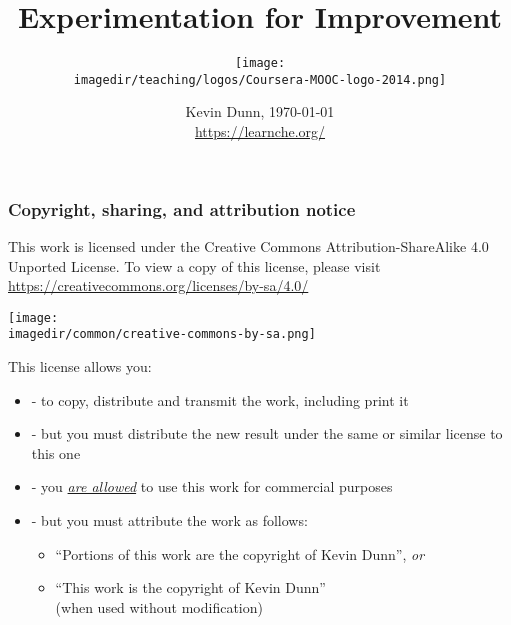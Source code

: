 \documentclass[handout,11pt,aspectratio=169,mathserif]{beamer}
\title[]{\LARGE Experimentation for Improvement}
\subtitle[]{\vspace{0.5cm} \texttt{[image: \\imagedir/teaching/logos/Coursera-MOOC-logo-2014.png]} \vspace{-1.5cm} }\author[]{}
\institute[]{}
\date[]{Kevin Dunn, \today \\ \vspace{0cm}
{{\footnotesize {\tt } \href{https://learnche.org/}{https://learnche.org/}\\} \vspace{0.5cm}}
{\LARGE \color{blue}{Design and Analysis of Experiments - An Overview}}
}
\begin{document}
\begin{frame} \titlepage \end{frame}
\begin{frame}\frametitle{Copyright, sharing, and attribution notice}

	{\footnotesize This work is licensed under the Creative Commons Attribution-ShareAlike 4.0 Unported License. To view a copy of this license,
	please visit \href{https://creativecommons.org/licenses/by-sa/4.0/}{https://creativecommons.org/licenses/by-sa/4.0/}}

	\vspace{0.0cm}
	\begin{flushright}
		\texttt{[image: \\imagedir/common/creative-commons-by-sa.png]}
	\end{flushright}
	\vspace{-0.4cm}
	\begin{exampleblock}{}
		{\small This license allows you: }
		\begin{itemize}
			\item	{} - to copy, distribute and transmit the work, including print it
			\item	{} - but you must distribute the new result under the same or similar license to this one
			\item	{} - you \underline{\emph{are allowed}} to use this work for commercial purposes
			\item	{} - but you must attribute the work as follows:
			\begin{itemize}
				\item	``Portions of this work are the copyright of Kevin Dunn'', \emph{or}
				\item	``This work is the copyright of Kevin Dunn'' \\{\tiny (when used without modification)}
			\end{itemize}
		\end{itemize}
	\end{exampleblock}
\end{frame}
\end{document}
